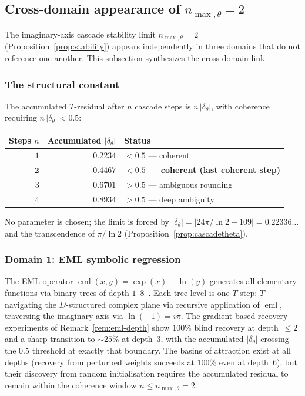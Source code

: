 \documentclass[11pt,a4paper]{article}
\theoremstyle{definition}
\theoremstyle{remark}
\begin{document}
\subsection{Cross-domain appearance of $n_{\max,\theta}=2$}\label{subsec:cross-domain-nmax}

The imaginary-axis cascade stability limit $n_{\max,\theta}=2$ (Proposition~\ref{prop:stability}) appears independently in three domains that do not reference one another. This subsection synthesizes the cross-domain link.

\subsubsection*{The structural constant}

The accumulated $T$-residual after $n$ cascade steps is $n\,|\delta_{\theta}|$, with coherence requiring $n\,|\delta_{\theta}| < 0.5$:
\begin{center}
\begin{tabular}{@{}r r l@{}}
\toprule
Steps $n$ & Accumulated $|\delta_{\theta}|$ & Status\\
\midrule
$1$ & $0.2234$ & $< 0.5$ --- coherent\\
$\mathbf{2}$ & $\mathbf{0.4467}$ & $\mathbf{< 0.5}$ \textbf{--- coherent (last coherent step)}\\
$3$ & $0.6701$ & $> 0.5$ --- ambiguous rounding\\
$4$ & $0.8934$ & $> 0.5$ --- deep ambiguity\\
\bottomrule
\end{tabular}
\end{center}
No parameter is chosen; the limit is forced by $|\delta_{\theta}| = |24\pi/\ln 2 - 109| = 0.22336\ldots$ and the transcendence of $\pi/\ln 2$ (Proposition~\ref{prop:cascadetheta}).

\subsubsection*{Domain 1: EML symbolic regression}

The EML operator $\operatorname{eml}(x,y) = \exp(x) - \ln(y)$ generates all elementary functions via binary trees of depth $1$--$8$~\cite{Odrzywolek2026}. Each tree level is one $T$-step: $T$ navigating the $D$-structured complex plane via recursive application of $\operatorname{eml}$, traversing the imaginary axis via $\ln(-1) = i\pi$. The gradient-based recovery experiments of Remark~\ref{rem:eml-depth} show $100\%$ blind recovery at depth~$\le 2$ and a sharp transition to $\sim 25\%$ at depth~$3$, with the accumulated $|\delta_{\theta}|$ crossing the $0.5$ threshold at exactly that boundary. The basins of attraction exist at all depths (recovery from perturbed weights succeeds at $100\%$ even at depth~$6$), but their discovery from random initialisation requires the accumulated residual to remain within the coherence window $n \le n_{\max,\theta}=2$.
\end{document}
